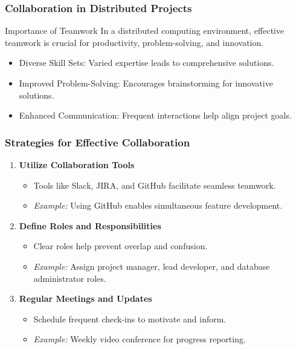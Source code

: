 \documentclass[aspectratio=169]{beamer}
\begin{document}
\begin{frame}[fragile]
    \frametitle{Collaboration in Distributed Projects}
    \begin{block}{Importance of Teamwork}
        In a distributed computing environment, effective teamwork is crucial for productivity, problem-solving, and innovation.
    \end{block}
    
    \begin{itemize}
        \item Diverse Skill Sets: Varied expertise leads to comprehensive solutions.
        \item Improved Problem-Solving: Encourages brainstorming for innovative solutions.
        \item Enhanced Communication: Frequent interactions help align project goals.
    \end{itemize}
\end{frame}

\begin{frame}[fragile]
    \frametitle{Strategies for Effective Collaboration}
    \begin{enumerate}
        \item \textbf{Utilize Collaboration Tools}
        \begin{itemize}
            \item Tools like Slack, JIRA, and GitHub facilitate seamless teamwork.
            \item \textit{Example:} Using GitHub enables simultaneous feature development.
        \end{itemize}
        
        \item \textbf{Define Roles and Responsibilities}
        \begin{itemize}
            \item Clear roles help prevent overlap and confusion.
            \item \textit{Example:} Assign project manager, lead developer, and database administrator roles.
        \end{itemize}
        
        \item \textbf{Regular Meetings and Updates}
        \begin{itemize}
            \item Schedule frequent check-ins to motivate and inform.
            \item \textit{Example:} Weekly video conference for progress reporting.
        \end{itemize}
    \end{enumerate}
\end{frame}
\end{document}
